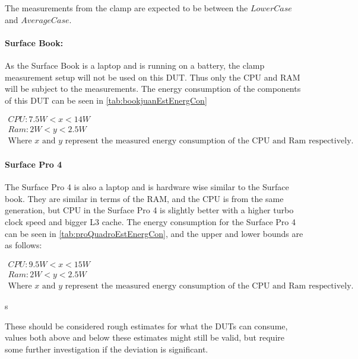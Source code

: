 The measurements from the clamp are expected to be between the $LowerCase$ and $AverageCase$.

\paragraph{Surface Book:} As the Surface Book is a laptop and is running on a battery, the clamp measurement setup will not be used on this DUT. Thus only the CPU and RAM will be subject to the measurements. The energy consumption of the components of this DUT can be seen in \cref{tab:bookjuanEstEnergCon}

\begin{gather*}
    CPU: 7.5W < x < 14W \\
    Ram: 2W < y < 2.5W \\
    \text{Where $x$ and $y$ represent the measured energy consumption of the CPU and Ram respectively.}
\end{gather*}




\paragraph{Surface Pro 4} The Surface Pro 4 is also a laptop and is hardware wise similar to the Surface book. They are similar in terms of the RAM, and the CPU is from the same generation, but CPU in the Surface Pro 4 is slightly better with a higher turbo clock speed and bigger L3 cache. The energy consumption for the Surface Pro 4 can be seen in \cref{tab:proQuadroEstEnergCon}, and the upper and lower bounds are as follows:

\begin{gather*}
    CPU: 9.5W < x < 15W \\
    Ram: 2W < y < 2.5W \\
    \text{Where $x$ and $y$ represent the measured energy consumption of the CPU and Ram respectively.}
\end{gather*}

s

These should be considered rough estimates for what the DUTs can consume, values both above and below these estimates might still be valid, but require some further investigation if the deviation is significant.